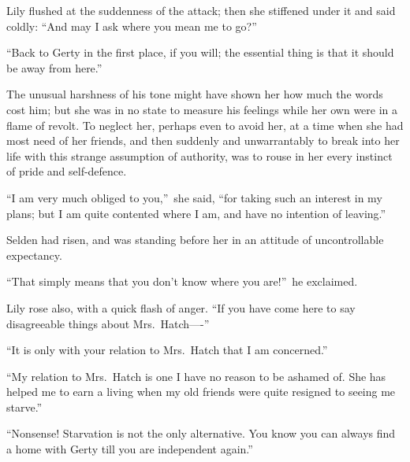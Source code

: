 \documentclass[12pt,a4paper]{book}
\begin{document}
Lily flushed at the suddenness of the attack; then she stiffened
under it and said coldly: ``And may I ask where you mean me to
go?''





``Back to Gerty in the first place, if you will; the essential
thing is that it should be away from here.''





The unusual harshness of his tone might have shown her how much
the words cost him; but she was in no state to measure his
feelings while her own were in a flame of revolt. To neglect her,
perhaps even to avoid her, at a time when she had most need of
her friends, and then suddenly and unwarrantably to break into
her life with this strange assumption of authority, was to rouse
in her every instinct of pride and self-defence.





``I am very much obliged to you,''\ she said, ``for taking such
an interest in my plans; but I am quite contented where I am,
and have no intention of leaving.''





Selden had risen, and was standing before her in an attitude of
uncontrollable expectancy.





``That simply means that you don't know where you are!''\ he
exclaimed.





Lily rose also, with a quick flash of anger. ``If you have come
here to say disagreeable things about Mrs.\ Hatch----''





``It is only with your relation to Mrs.\ Hatch that I am
concerned.''





``My relation to Mrs.\ Hatch is one I have no reason to be ashamed
of. She has helped me to earn a living when my old friends were
quite resigned to seeing me starve.''





``Nonsense! Starvation is not the only alternative. You know you
can always find a home with Gerty till you are independent
again.''
\end{document}
